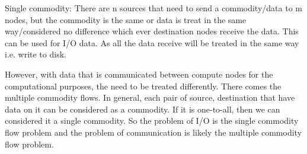 \documentclass[letter]{article}
\begin{document}
Single commodity: There are n sources that need to send a commodity/data to m nodes, but the commodity is the same or data is treat in the same way/considered no difference which ever destination nodes receive the data. This can be used for I/O data. As all the data receive will be treated in the same way i.e. write to disk. 

However, with data that is communicated between compute nodes for the computational purposes, the need to be treated differently. There comes the multiple commodity flows. In general, each pair of source, destination that have data on it can be considered as a commodity. If it is one-to-all, then we can considered it a single commodity. So the problem of I/O is the single commodity flow problem and the problem of communication is likely the multiple commodity flow problem.
\end{document}
